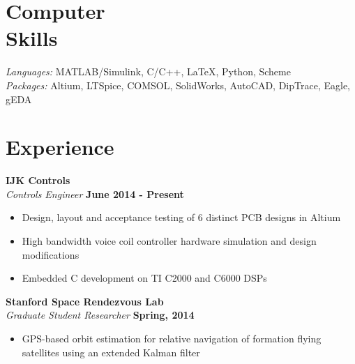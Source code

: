 \documentclass[margin,line]{resume}
\begin{document}
\begin{resume}
    \section{\mysidestyle Computer\\ Skills}

    \textsl{Languages:} MATLAB/Simulink, C/C++, \LaTeX , Python, Scheme\\
    \textsl{Packages:} Altium, LTSpice, COMSOL, SolidWorks, AutoCAD, DipTrace, Eagle, gEDA%


    \section{\mysidestyle Experience}

    \textbf{IJK Controls}\\
    \textsl{Controls Engineer} \hfill \textbf{June 2014 - Present}\\ \vspace{-4mm}
    \begin{itemize} \itemsep -2pt
        \item Design, layout and acceptance testing of 6 distinct PCB designs in Altium
        \item High bandwidth voice coil controller hardware simulation and design modifications
        \item Embedded C development on TI C2000 and C6000 DSPs
    \end{itemize} \vspace{-2.25mm}

    \textbf{Stanford Space Rendezvous Lab}\\
    \textsl{Graduate Student Researcher} \hfill \textbf{Spring, 2014}\\ \vspace{-4mm}
    \begin{itemize} \itemsep -2pt
        \item GPS-based orbit estimation for relative navigation of formation flying satellites using an extended Kalman filter
    \end{itemize} \vspace{-2.25mm}


\end{resume}
\end{document}
